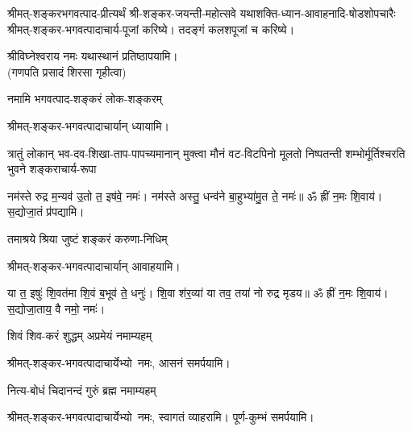श्रीमत्-शङ्करभगवत्पाद-प्रीत्यर्थं
श्री-शङ्कर-जयन्ती-महोत्सवे
यथाशक्ति-ध्यान-आवाहनादि-षोडशो\-पचारैः श्रीमत्-शङ्कर-भगवत्पादाचार्य-पूजां करिष्ये। तदङ्गं कलशपूजां च करिष्ये।

श्रीविघ्नेश्वराय नमः यथास्थानं प्रतिष्ठापयामि।\\
(गणपति प्रसादं शिरसा गृहीत्वा)
\renewcommand{\devaName}{श्रीमत्-शङ्कर-भगवत्पादाचार्याः}













\begin{center}


\begingroup
\centering
{}
{नमामि भगवत्पाद-शङ्करं लोक-शङ्करम्}


श्रीमत्-शङ्कर-भगवत्पादाचार्यान् ध्यायामि।

{त्रातुं लोकान् भव-दव-शिखा-ताप-पापच्यमानान्}
{मुक्त्वा मौनं वट-विटपिनो मूलतो निष्पतन्ती}
{शम्भोर्मूर्तिश्चरति भुवने शङ्कराचार्य-रूपा}

नम॑स्ते रुद्र म॒न्यव॑ उ॒तो त॒ इष॑वे॒ नमः॑। नम॑स्ते अस्तु॒ धन्व॑ने बा॒हुभ्या॑मु॒त ते॒ नमः॑॥ ॐ ह्रीं न॒मः शि॒वाय॑। स॒द्योजा॒तं प्र॑पद्यामि।

{तमाश्रये श्रिया जुष्टं शङ्करं करुणा-निधिम्}

श्रीमत्-शङ्कर-भगवत्पादाचार्यान् आवाहयामि।

या त॒ इषुः॑ शि॒वत॑मा शि॒वं ब॒भूव॑ ते॒ धनुः॑। शि॒वा श॑र॒व्या॑ या तव॒ तया॑ नो रुद्र मृडय॥ ॐ ह्रीं न॒मः शि॒वाय॑। स॒द्योजा॒ताय॒ वै नमो॒ नमः॑। 

{शिवं शिव-करं शुद्धम् अप्रमेयं नमाम्यहम्}

श्रीमत्-शङ्कर-भगवत्पादाचार्येभ्यो~नमः, आसनं समर्पयामि।

{नित्य-बोधं चिदानन्दं गुरुं ब्रह्म नमाम्यहम्}

श्रीमत्-शङ्कर-भगवत्पादाचार्येभ्यो~नमः, स्वागतं व्याहरामि। पूर्ण-कुम्भं समर्पयामि।


\end{center}
